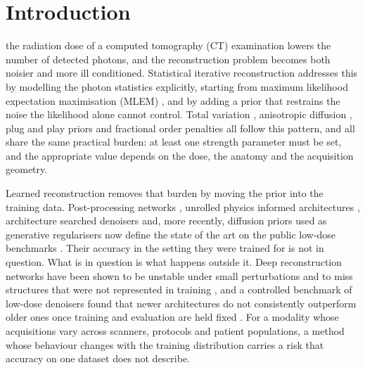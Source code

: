 \section{Introduction}
\label{sec:intro}

 the radiation dose of a computed tomography (CT)
examination lowers the number of detected photons, and the reconstruction
problem becomes both noisier and more ill conditioned. Statistical iterative
reconstruction addresses this by modelling the photon statistics explicitly,
starting from maximum likelihood expectation maximisation (MLEM)
\cite{shepp1982}, and by adding a prior that restrains the noise the
likelihood alone cannot control. Total variation \cite{sidky2008},
anisotropic diffusion \cite{perona1990}, plug and play priors
\cite{venkatakrishnan2013} and fractional order penalties
\cite{zhang2016fractional} all follow this pattern, and all share the same
practical burden: at least one strength parameter must be set, and the
appropriate value depends on the dose, the anatomy and the acquisition
geometry.

Learned reconstruction removes that burden by moving the prior into the
training data. Post-processing networks \cite{chen2017redcnn,yang2018wgan},
unrolled physics informed architectures
\cite{adler2018lpd,wu2021drone,xiang2021fista}, architecture searched
denoisers \cite{lu2023m3nas} and, more recently, diffusion priors used as
generative regularisers \cite{chung2023dps,gao2024corediff,liu2024mar} now
define the state of the art on the public low-dose benchmarks
\cite{moen2021mayo,leuschner2021lodopab}. Their accuracy in the setting they
were trained for is not in question. What is in question is what happens
outside it. Deep reconstruction networks have been shown to be unstable under
small perturbations and to miss structures that were not represented in
training \cite{antun2020,genzel2023}, and a controlled benchmark of low-dose
denoisers found that newer architectures do not consistently outperform older
ones once training and evaluation are held fixed \cite{eulig2024}. For a
modality whose acquisitions vary across scanners, protocols and patient
populations, a method whose behaviour changes with the training distribution
carries a risk that accuracy on one dataset does not describe.

